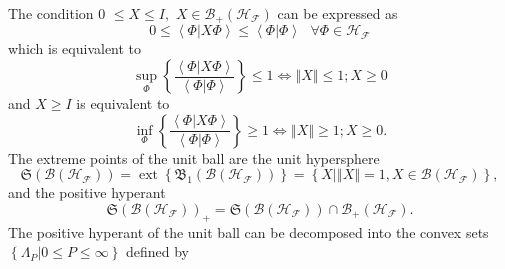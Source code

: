 \documentclass[aps,preprint]{revtex4}%
\begin{document}
The condition $0$ $\leq X\leq I,$ $X\in\mathcal{B}_{+}\left(  \mathcal{H}%
_{\mathcal{F}}\right)  $ can be expressed as
\begin{equation}
0\leq\left\langle \left.  \Phi\right\vert X\Phi\right\rangle \leq\left\langle
\left.  \Phi\right\vert \Phi\right\rangle \text{ }\forall\Phi\in
\mathcal{H}_{\mathcal{F}}%
\end{equation}
which is equivalent to
\begin{equation}
\sup_{\Phi}\left\{  \frac{\left\langle \left.  \Phi\right\vert X\Phi
\right\rangle }{\left\langle \left.  \Phi\right\vert \Phi\right\rangle
}\right\}  \leq1\Leftrightarrow\left\Vert X\right\Vert \leq1;X\geq0
\end{equation}
and $X\geq I$ is equivalent to
\begin{equation}
\inf_{\Phi}\left\{  \frac{\left\langle \left.  \Phi\right\vert X\Phi
\right\rangle }{\left\langle \left.  \Phi\right\vert \Phi\right\rangle
}\right\}  \geq1\Leftrightarrow\left\Vert X\right\Vert \geq1;X\geq0.
\end{equation}
The extreme points of the unit ball are the unit hypersphere
\begin{equation}
\mathfrak{S}\left(  \mathcal{B}\left(  \mathcal{H}_{\mathcal{F}}\right)
\right)  =\operatorname*{ext}\left\{  \mathfrak{B}_{1}\left(  \mathcal{B}%
\left(  \mathcal{H}_{\mathcal{F}}\right)  \right)  \right\}  =\left\{
X\left\vert \left\Vert X\right\Vert =1,X\in\mathcal{B}\left(  \mathcal{H}%
_{\mathcal{F}}\right)  \right.  \right\}  ,
\end{equation}
and the positive hyperant
\begin{equation}
\mathfrak{S}\left(  \mathcal{B}\left(  \mathcal{H}_{\mathcal{F}}\right)
\right)  _{+}=\mathfrak{S}\left(  \mathcal{B}\left(  \mathcal{H}_{\mathcal{F}%
}\right)  \right)  \cap\mathcal{B}_{+}\left(  \mathcal{H}_{\mathcal{F}%
}\right)  .
\end{equation}
The positive hyperant of the unit ball can be decomposed into the convex sets
$\left\{  \left.  \Lambda_{P}\right\vert 0\leq P\leq\infty\right\}  $ defined by
\end{document}
